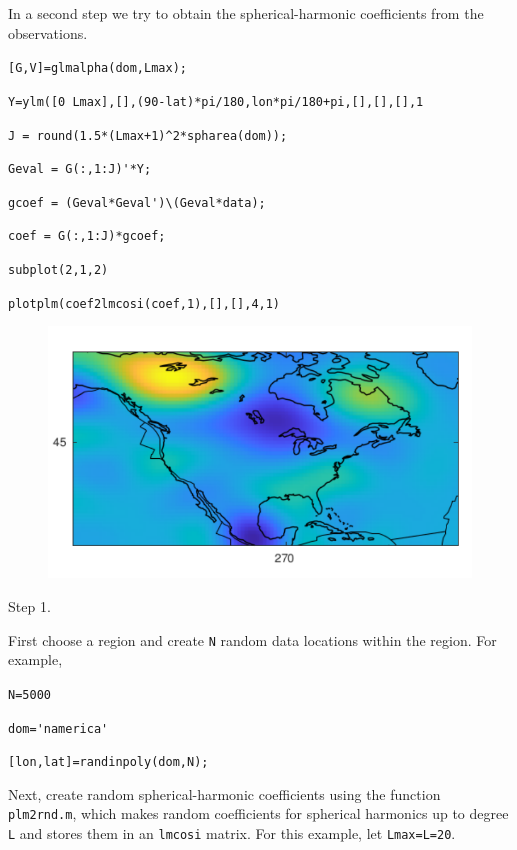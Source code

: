 \documentclass{article}
\begin{document}
\setlength{\parskip}{0.5cm plus4mm minus3mm}

In a second step we try to obtain the spherical-harmonic coefficients from the observations.

\vspace{3mm}

\setlength{\parskip}{.1mm}

\verb![G,V]=glmalpha(dom,Lmax);!

\verb!Y=ylm([0 Lmax],[],(90-lat)*pi/180,lon*pi/180+pi,[],[],[],1!

\verb!J = round(1.5*(Lmax+1)^2*spharea(dom));!

\verb!Geval = G(:,1:J)'*Y;!

\verb!gcoef = (Geval*Geval')\(Geval*data);!

\verb!coef = G(:,1:J)*gcoef;!

\verb!subplot(2,1,2)!

\verb!plotplm(coef2lmcosi(coef,1),[],[],4,1)!

\begin{figure}[H]
\includegraphics[scale=.75]{namerica_solvedcoefficients}
\end{figure}

\setlength{\parskip}{0.5cm plus4mm minus3mm}

Step 1.

First choose a region and create \verb!N! random data locations within the region. For example,

\verb!N=5000!

\verb!dom='namerica'!

\verb![lon,lat]=randinpoly(dom,N);!

Next, create random spherical-harmonic coefficients using the function \verb!plm2rnd.m!, which makes random coefficients for spherical harmonics up to degree \verb!L! and stores them in an \verb!lmcosi! matrix. For this example, let \verb!Lmax=L=20!.
\end{document}
